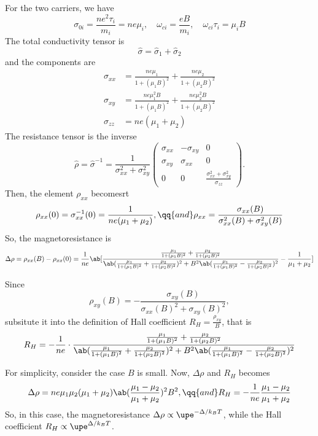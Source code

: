 \begin{solution}\leavevmode
  \begin{enumext}[label = (\alph*)]
    \item For the two carriers, we have
    \[
      \sigma_{0i} = \frac{ne^2\tau_i}{m_i} = ne\mu_i,\quad
      \omega_{ci} = \frac{eB}{m_i},\quad
      \omega_{ci}\tau_i = \mu_iB
    \]
    The total conductivity tensor is
    \[
      \hat\sigma = \hat\sigma_1 + \hat\sigma_2
    \]
    and the components are
    \begin{align*}
      \sigma_{xx} & = \frac{ne\mu_1}{1 + (\mu_1B)^2}
                    + \frac{ne\mu_2}{1 + (\mu_2B)^2}\\
      \sigma_{xy} & = \frac{ne\mu_1^2B}{1 + (\mu_1B)^2}
                    + \frac{ne\mu_2^2B}{1 + (\mu_2B)^2}\\
      \sigma_{zz} & = ne(\mu_1 + \mu_2)
    \end{align*}
    The resistance tensor is the inverse
    \[
      \hat\rho = \hat\sigma^{-1}
    = \frac{1}{\sigma_{xx}^2 + \sigma_{xy}^2}
    \begin{pmatrix}
      \sigma_{xx} & -\sigma_{xy} & 0\\
      \sigma_{xy} & \sigma_{xx}  & 0\\
      0 & 0 & \frac{\sigma_{xx}^2+\sigma_{xy}^2}{\sigma_{zz}}
    \end{pmatrix}.
    \]
    Then, the element $\rho_{xx}$ becomesrt
    \[
      \rho_{xx}(0) = \sigma_{xx}^{-1}(0) = \frac{1}{ne(\mu_1 + \mu_2)}, \qq{and}
      \rho_{xx} = \frac{\sigma_{xx}(B)}{\sigma_{xx}^2(B) + \sigma_{xy}^2(B)}
    \]
    So, the magnetoresistance is
    \[
      \Delta \rho = \rho_{xx}(B) - \rho_{xx}(0)
    = \frac1{ne}\ab[
      \frac{\frac{\mu_1}{1+(\mu_1B)^2} + \frac{\mu_2}{1+(\mu_2B)^2}}
        {\ab(\frac{\mu_1}{1+(\mu_1B)^2} + \frac{\mu_2}{1+(\mu_2B)^2})^2
    + B^2\ab(\frac{\mu_1}{1+(\mu_1B)^2} - \frac{\mu_2}{1+(\mu_2B)^2})^2} -
      \frac1{\mu_1 + \mu_2}]
    \]
    \newpage
    \item Since
    \[
      \rho_{xy}(B) = -\frac{\sigma_{xy}(B)}
        {\sigma_{xx}(B)^2 + \sigma_{xy}(B)^2},
    \]
    subsitute it into the definition of Hall coefficient
    $R_H = \frac{\rho_{xy}}{B}$, that is
    \[
      R_H = -\frac1{ne} \cdot
      \frac{\frac{\mu_1}{1+(\mu_1B)^2} + \frac{\mu_2}{1+(\mu_2B)^2}}
        {\ab(\frac{\mu_1}{1+(\mu_1B)^2} + \frac{\mu_2}{1+(\mu_2B)^2})^2
    + B^2\ab(\frac{\mu_1}{1+(\mu_1B)^2} - \frac{\mu_2}{1+(\mu_2B)^2})^2}
    \]
    \item For simplicity, consider the case $B$ is small.
    Now, $\Delta\rho$ and $R_H$ becomes
    \[
      \Delta\rho = ne\mu_1\mu_2(\mu_1 + \mu_2)
        \ab(\frac{\mu_1 - \mu_2}{\mu_1 + \mu_2})^2 B^2, \qq{and}
      R_H = -\frac1{ne} \frac{\mu_1 - \mu_2}{\mu_1 + \mu_2}
    \]
    So, in this case, the magnetoresistance
    $\Delta\rho \propto \upe^{-\Delta/k_BT}$, while the Hall coefficient
    $R_H \propto \upe^{\Delta/k_BT}$.
  \end{enumext}
\end{solution}

